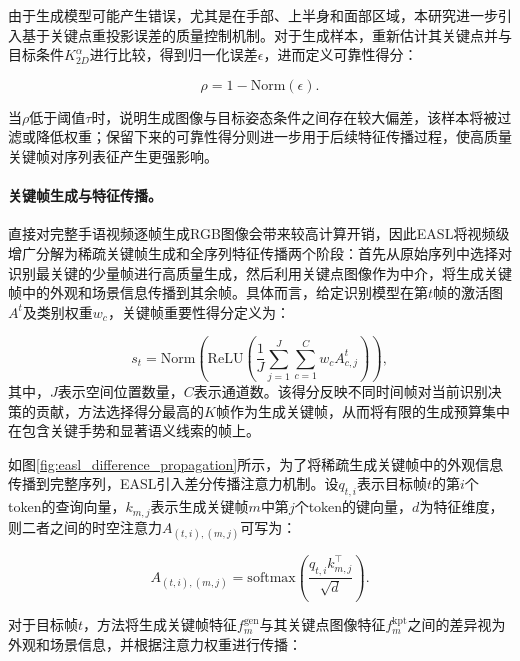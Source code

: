 由于生成模型可能产生错误，尤其是在手部、上半身和面部区域，本研究进一步引入基于关键点重投影误差的质量控制机制。对于生成样本，重新估计其关键点并与目标条件$K_{2D}^{\alpha}$进行比较，得到归一化误差$\epsilon$，进而定义可靠性得分：

\begin{equation}
    \rho = 1 - \mathrm{Norm}(\epsilon).
    \label{eq:easl_reliability}
\end{equation}

当$\rho$低于阈值$\tau$时，说明生成图像与目标姿态条件之间存在较大偏差，该样本将被过滤或降低权重；保留下来的可靠性得分则进一步用于后续特征传播过程，使高质量关键帧对序列表征产生更强影响。

\paragraph{关键帧生成与特征传播。}

直接对完整手语视频逐帧生成RGB图像会带来较高计算开销，因此EASL将视频级增广分解为稀疏关键帧生成和全序列特征传播两个阶段：首先从原始序列中选择对识别最关键的少量帧进行高质量生成，然后利用关键点图像作为中介，将生成关键帧中的外观和场景信息传播到其余帧。具体而言，给定识别模型在第$t$帧的激活图$A^t$及类别权重$w_c$，关键帧重要性得分定义为：

\begin{equation}
    s_t
    =
    \mathrm{Norm}
    \left(
    \mathrm{ReLU}
    \left(
    \frac{1}{J}
    \sum_{j=1}^{J}
    \sum_{c=1}^{C}
    w_c A^t_{c,j}
    \right)
    \right),
    \label{eq:easl_keyframe_score}
\end{equation}
其中，$J$表示空间位置数量，$C$表示通道数。该得分反映不同时间帧对当前识别决策的贡献，方法选择得分最高的$K$帧作为生成关键帧，从而将有限的生成预算集中在包含关键手势和显著语义线索的帧上。

如图\ref{fig:easl_difference_propagation}所示，为了将稀疏生成关键帧中的外观信息传播到完整序列，EASL引入差分传播注意力机制。设$q_{t,i}$表示目标帧$t$的第$i$个token的查询向量，$k_{m,j}$表示生成关键帧$m$中第$j$个token的键向量，$d$为特征维度，则二者之间的时空注意力$A_{(t,i),(m,j)}$可写为：

\begin{equation}
    A_{(t,i),(m,j)}
    =
    \mathrm{softmax}
    \left(
    \frac{q_{t,i} k_{m,j}^{\top}}{\sqrt{d}}
    \right).
    \label{eq:easl_attention}
\end{equation}


对于目标帧$t$，方法将生成关键帧特征$f_m^{\mathrm{gen}}$与其关键点图像特征$f_m^{\mathrm{kpt}}$之间的差异视为外观和场景信息，并根据注意力权重进行传播：

